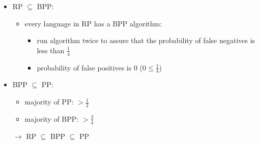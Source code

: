 \documentclass[a4]{scrartcl}
\begin{document}
\begin{itemize}
\item RP $\subseteq$ BPP:
\begin{itemize}
\item every language in RP has a BPP algorithm:
\begin{itemize}
\item run algorithm twice to assure that the probability of false negatives is less than $\frac{1}{4}$
\item probability of false positives is 0 ($0 \leq \frac{1}{4}$)
\end{itemize}
\end{itemize}
\item BPP $\subseteq$ PP:
\begin{itemize}
\item majority of PP: $> \frac{1}{2}$
\item majority of BPP: $> \frac{3}{4}$
\end{itemize}
\item[$\rightarrow$] RP $\subseteq$ BPP $\subseteq$ PP
\end{itemize}










\newpage

\printbibliography
\end{document}
